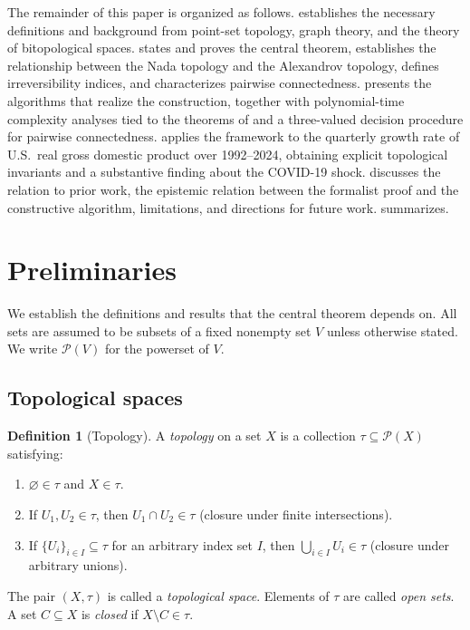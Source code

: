 \documentclass[11pt,a4paper]{article}
\theoremstyle{plain}
\theoremstyle{definition}
\newtheorem{definition}[theorem]{Definition}
\newcommand{\powerset}{\mathcal{P}}
\begin{document}
The remainder of this paper is organized as follows.
 establishes the necessary definitions and background
from point-set topology, graph theory, and the theory of bitopological
spaces.   states and proves the central theorem,
establishes the relationship between the Nada topology and the
Alexandrov topology, defines irreversibility indices, and characterizes
pairwise connectedness.   presents the algorithms
that realize the construction, together with polynomial-time complexity
analyses tied to the theorems of  and a three-valued
decision procedure for pairwise connectedness.  
applies the framework to the quarterly growth rate of U.S.\ real gross
domestic product over 1992--2024, obtaining explicit topological
invariants and a substantive finding about the COVID-19 shock.
 discusses the relation to prior work, the
epistemic relation between the formalist proof and the constructive
algorithm, limitations, and directions for future work.
 summarizes.

\section{Preliminaries}\label{sec:prelim}

We establish the definitions and results that the central theorem depends on.
All sets are assumed to be subsets of a fixed nonempty set $V$ unless otherwise
stated.  We write $\powerset(V)$ for the powerset of $V$.

\subsection{Topological spaces}\label{subsec:topology}

\begin{definition}[Topology]\label{def:topology}
A \emph{topology} on a set $X$ is a collection $\tau \subseteq \powerset(X)$
satisfying:
\begin{enumerate}[label=(\roman*),nosep]
  \item $\varnothing \in \tau$ and $X \in \tau$.
  \item If $U_1, U_2 \in \tau$, then $U_1 \cap U_2 \in \tau$
        (closure under finite intersections).
  \item If $\{U_i\}_{i \in I} \subseteq \tau$ for an arbitrary index set $I$,
        then $\bigcup_{i \in I} U_i \in \tau$ (closure under arbitrary unions).
\end{enumerate}
The pair $(X, \tau)$ is called a \emph{topological space}.  Elements of $\tau$
are called \emph{open sets}.  A set $C \subseteq X$ is \emph{closed} if
$X \setminus C \in \tau$.
\end{definition}
\end{document}
